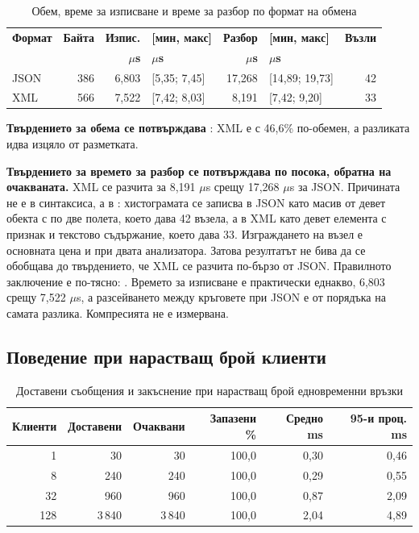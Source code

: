 \begin{table}[H]
\caption{Обем, време за изписване и време за разбор по формат на обмена}
\label{tab:formats}
\centering
\fontsize{11}{13.2}\selectfont
\begin{tabular}{@{}L{1.9cm}rrL{2.5cm}rL{2.5cm}r@{}}
\toprule
\textbf{Формат} & \textbf{Байта} & \textbf{Изпис.} & \textbf{[мин, макс]} & \textbf{Разбор} & \textbf{[мин, макс]} & \textbf{Възли} \\
 & & \textbf{$\mu$s} & \textbf{$\mu$s} & \textbf{$\mu$s} & \textbf{$\mu$s} & \\
\midrule
JSON & 386 & 6,803 & [5,35; 7,45] & 17,268 & [14,89; 19,73] & 42 \\
XML  & 566 & 7,522 & [7,42; 8,03] &  8,191 & [7,42; 9,20]   & 33 \\
\bottomrule
\end{tabular}
\end{table}

\textbf{Твърдението за обема се потвърждава} : XML е с 46,6\% по-обемен, а
разликата идва изцяло от разметката.

\textbf{Твърдението за времето за разбор се потвърждава по посока, обратна на очакваната.} XML
се разчита за 8,191 $\mu$s срещу 17,268 $\mu$s за JSON. Причината не
е в синтаксиса, а в : хистограмата се записва в JSON като масив от
девет обекта с по две полета, което дава 42 възела, а в XML като девет елемента с признак и
текстово съдържание, което дава 33. Изграждането на възел е основната цена и при двата
анализатора. Затова резултатът не бива да се обобщава до твърдението, че XML се разчита
по-бързо от JSON. Правилното заключение е по-тясно: . Времето за изписване е практически еднакво, 6,803 срещу 7,522 $\mu$s, а
разсейването между кръговете при JSON е от порядъка на самата разлика. Компресията не е
измервана.

\subsection{Поведение при нарастващ брой клиенти}

\begin{table}[H]
\caption{Доставени съобщения и закъснение при нарастващ брой едновременни връзки}
\label{tab:scaling}
\centering
\fontsize{11}{13.2}\selectfont
\begin{tabular}{@{}rrrrrr@{}}
\toprule
\textbf{Клиенти} & \textbf{Доставени} & \textbf{Очаквани} & \textbf{Запазени \%} & \textbf{Средно ms} & \textbf{95-и проц. ms} \\
\midrule
1   & 30    & 30    & 100,0 & 0,30 & 0,46 \\
8   & 240   & 240   & 100,0 & 0,29 & 0,55 \\
32  & 960   & 960   & 100,0 & 0,87 & 2,09 \\
128 & 3\,840 & 3\,840 & 100,0 & 2,04 & 4,89 \\
\bottomrule
\end{tabular}
\end{table}

